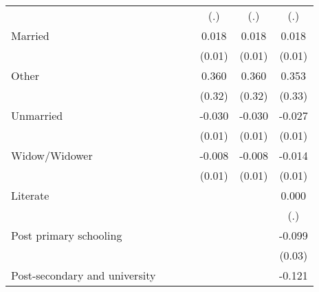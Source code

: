 {\begin{tabular}{l*{6}{c}}
                    &                     &                     &                     &         (.)         &         (.)         &         (.)         \\
Married             &                     &                     &                     &       0.018\sym{*}  &       0.018\sym{*}  &       0.018\sym{*}  \\
                    &                     &                     &                     &      (0.01)         &      (0.01)         &      (0.01)         \\
Other               &                     &                     &                     &       0.360         &       0.360         &       0.353         \\
                    &                     &                     &                     &      (0.32)         &      (0.32)         &      (0.33)         \\
Unmarried           &                     &                     &                     &      -0.030\sym{***}&      -0.030\sym{***}&      -0.027\sym{**} \\
                    &                     &                     &                     &      (0.01)         &      (0.01)         &      (0.01)         \\
Widow/Widower       &                     &                     &                     &      -0.008         &      -0.008         &      -0.014         \\
                    &                     &                     &                     &      (0.01)         &      (0.01)         &      (0.01)         \\
Literate            &                     &                     &                     &                     &                     &       0.000         \\
                    &                     &                     &                     &                     &                     &         (.)         \\
Post primary schooling&                     &                     &                     &                     &                     &      -0.099\sym{***}\\
                    &                     &                     &                     &                     &                     &      (0.03)         \\
Post-secondary and university&                     &                     &                     &                     &                     &      -0.121\sym{***}\\

\end{tabular}}
